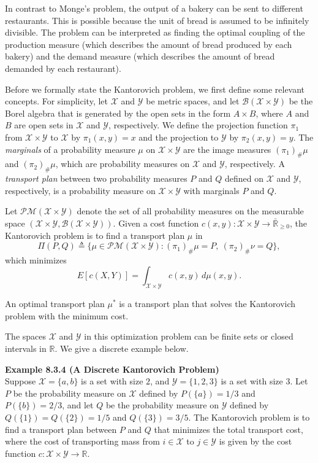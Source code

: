 In contrast to Monge's problem, the output of a bakery can be sent to different restaurants. This is possible because the unit of bread is assumed to be infinitely divisible. The problem can be interpreted as finding the optimal coupling of the production measure (which describes the amount of bread produced by each bakery) and the demand measure (which describes the amount of bread demanded by each restaurant).

Before we formally state the Kantorovich problem, we first define some relevant concepts. For simplicity, let $\mathcal{X}$ and $\mathcal{Y}$ be metric spaces, and let $\mathcal{B}(\mathcal{X}\times \mathcal{Y})$ be the Borel algebra that is generated by the open sets in the form $A\times B$, where $A$ and $B$ are open sets in $\mathcal{X}$ and $\mathcal{Y}$, respectively. We define the projection function $\pi_1$ from $\mathcal{X}\times \mathcal{Y}$ to $\mathcal{X}$ by $\pi_1(x,y)=x$ and the projection to $\mathcal{Y}$ by $\pi_2(x,y)=y$. The \textit{marginals} of a probability measure $\mu$ on $\mathcal{X}\times \mathcal{Y}$ are the image measures $(\pi_1)_{\#}\mu$ and $(\pi_2)_{\#}\mu$, which are probability measures on $\mathcal{X}$ and $\mathcal{Y}$, respectively. A \textit{transport plan} between two probability measures $P$ and $Q$ defined on $\mathcal{X}$ and $\mathcal{Y}$, respectively, is a probability measure on $\mathcal{X}\times \mathcal{Y}$ with marginals $P$ and $Q$.

Let $\mathcal{PM}(\mathcal{X}\times \mathcal{Y})$ denote the set of all probability measures on the measurable space $(\mathcal{X}\times \mathcal{Y},\mathcal{B}(\mathcal{X}\times \mathcal{Y}))$. Given a cost function $c(x,y):\mathcal{X}\times \mathcal{Y}\to \bar{\mathbb{R}}_{\ge 0}$, the Kantorovich problem is to find a transport plan $\mu$ in
\[
\Pi(P,Q)\triangleq \{\mu\in \mathcal{PM}(\mathcal{X}\times \mathcal{Y}) : (\pi_1)_{\#}\mu=P,\ (\pi_2)_{\#}\nu=Q\},
\]
which minimizes
\begin{equation}
E[c(X,Y)] = \int_{\mathcal{X}\times \mathcal{Y}} c(x,y)\, d\mu(x,y).
\tag{8.2}
\end{equation}

An optimal transport plan $\mu^{*}$ is a transport plan that solves the Kantorovich problem with the minimum cost.

The spaces $\mathcal{X}$ and $\mathcal{Y}$ in this optimization problem can be finite sets or closed intervals in $\mathbb{R}$. We give a discrete example below.

\textbf{Example 8.3.4 (A Discrete Kantorovich Problem)} \\
Suppose $\mathcal{X}=\{a,b\}$ is a set with size $2$, and $\mathcal{Y}=\{1,2,3\}$ is a set with size $3$. Let $P$ be the probability measure on $\mathcal{X}$ defined by $P(\{a\})=1/3$ and $P(\{b\})=2/3$, and let $Q$ be the probability measure on $\mathcal{Y}$ defined by $Q(\{1\})=Q(\{2\})=1/5$ and $Q(\{3\})=3/5$. The Kantorovich problem is to find a transport plan between $P$ and $Q$ that minimizes the total transport cost, where the cost of transporting mass from $i\in \mathcal{X}$ to $j\in \mathcal{Y}$ is given by the cost function $c:\mathcal{X}\times \mathcal{Y}\to \mathbb{R}$.

